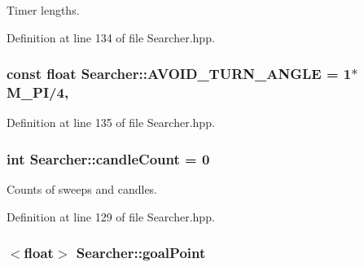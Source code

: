 Timer lengths. 



Definition at line 134 of file Searcher.\-hpp.

\hypertarget{classSearcher_afbe5b3bf208f18f77a3dcdb0aa86a96c}{
\subsubsection[{A\-V\-O\-I\-D\-\_\-\-T\-U\-R\-N\-\_\-\-A\-N\-G\-L\-E}]{\setlength{\rightskip}{0pt plus 5cm}const float Searcher\-::\-A\-V\-O\-I\-D\-\_\-\-T\-U\-R\-N\-\_\-\-A\-N\-G\-L\-E = 1$\ast$M\-\_\-\-P\-I/4\hspace{0.3cm}{\ttfamily [static]}, {\ttfamily [private]}}}\label{classSearcher_afbe5b3bf208f18f77a3dcdb0aa86a96c}


Definition at line 135 of file Searcher.\-hpp.

\hypertarget{classSearcher_acd63673f1b401dffee29f88eceaa1ada}{
\subsubsection[{candle\-Count}]{\setlength{\rightskip}{0pt plus 5cm}int Searcher\-::candle\-Count = 0\hspace{0.3cm}{\ttfamily [private]}}}\label{classSearcher_acd63673f1b401dffee29f88eceaa1ada}


Counts of sweeps and candles. 



Definition at line 129 of file Searcher.\-hpp.

\hypertarget{classSearcher_ae2eb4f5be779517a4e3264b0223459e2}{
\subsubsection[{goal\-Point}]{$<$float$>$ Searcher\-::goal\-Point\hspace{0.3cm}{\ttfamily [private]}}}\label{classSearcher_ae2eb4f5be779517a4e3264b0223459e2}


